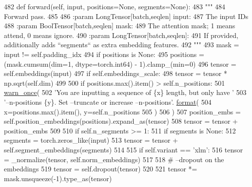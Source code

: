 \begin{DoxyCode}
482     \textcolor{keyword}{def }forward(self, input, positions=None, segments=None):
483         \textcolor{stringliteral}{"""}
484 \textcolor{stringliteral}{        Forward pass.}
485 \textcolor{stringliteral}{}
486 \textcolor{stringliteral}{        :param LongTensor[batch,seqlen] input:}
487 \textcolor{stringliteral}{            The input IDs}
488 \textcolor{stringliteral}{        :param BoolTensor[batch,seqlen] mask:}
489 \textcolor{stringliteral}{            The attention mask; 1 means attend, 0 means ignore.}
490 \textcolor{stringliteral}{        :param LongTensor[batch,seqlen]:}
491 \textcolor{stringliteral}{            If provided, additionally adds ``segments`` as extra embedding features.}
492 \textcolor{stringliteral}{        """}
493         mask = input != self.padding\_idx
494         \textcolor{keywordflow}{if} positions \textcolor{keywordflow}{is} \textcolor{keywordtype}{None}:
495             positions = (mask.cumsum(dim=1, dtype=torch.int64) - 1).clamp\_(min=0)
496         tensor = self.embeddings(input)
497         \textcolor{keywordflow}{if} self.embeddings\_scale:
498             tensor = tensor * np.sqrt(self.dim)
499 
500         \textcolor{keywordflow}{if} positions.max().item() > self.n\_positions:
501             \hyperlink{namespaceparlai_1_1utils_1_1misc_a884a3aefa90581f53bc592fa6a78dc43}{warn\_once}(
502                 \textcolor{stringliteral}{'You are inputting a sequence of \{x\} length, but only have '}
503                 \textcolor{stringliteral}{'--n-positions \{y\}. Set --truncate or increase --n-positions'}.
      \hyperlink{namespaceparlai_1_1chat__service_1_1services_1_1messenger_1_1shared__utils_a32e2e2022b824fbaf80c747160b52a76}{format}(
504                     x=positions.max().item(), y=self.n\_positions
505                 )
506             )
507         position\_embs = self.position\_embeddings(positions).expand\_as(tensor)
508         tensor = tensor + position\_embs
509 
510         \textcolor{keywordflow}{if} self.n\_segments >= 1:
511             \textcolor{keywordflow}{if} segments \textcolor{keywordflow}{is} \textcolor{keywordtype}{None}:
512                 segments = torch.zeros\_like(input)
513             tensor = tensor + self.segment\_embeddings(segments)
514 
515         \textcolor{keywordflow}{if} self.variant == \textcolor{stringliteral}{'xlm'}:
516             tensor = \_normalize(tensor, self.norm\_embeddings)
517 
518         \textcolor{comment}{# --dropout on the embeddings}
519         tensor = self.dropout(tensor)
520 
521         tensor *= mask.unsqueeze(-1).type\_as(tensor)

\end{DoxyCode}
